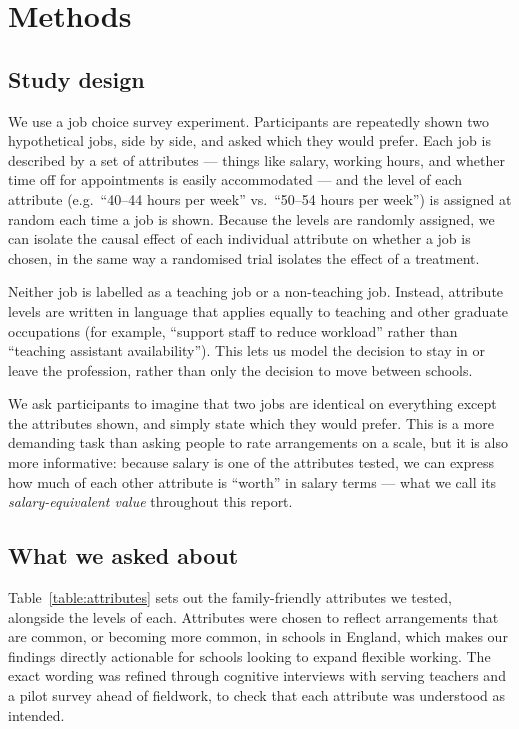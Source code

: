 \chapter{Methods}

\section{Study design}

We use a job choice survey experiment. Participants are repeatedly shown two hypothetical jobs,
side by side, and asked which they would prefer. Each job is described by a set of attributes ---
things like salary, working hours, and whether time off for appointments is easily accommodated
--- and the level of each attribute (e.g.\ ``40--44 hours per week'' vs.\ ``50--54 hours per
week'') is assigned at random each time a job is shown. Because the levels are randomly assigned,
we can isolate the causal effect of each individual attribute on whether a job is chosen, in the
same way a randomised trial isolates the effect of a treatment.

Neither job is labelled as a teaching job or a non-teaching job. Instead, attribute levels are
written in language that applies equally to teaching and other graduate occupations (for example,
``support staff to reduce workload'' rather than ``teaching assistant availability''). This lets
us model the decision to stay in or leave the profession, rather than only the decision to move
between schools.

We ask participants to imagine that two jobs are identical on everything except the attributes
shown, and simply state which they would prefer. This is a more demanding task than asking people
to rate arrangements on a scale, but it is also more informative: because salary is one of the
attributes tested, we can express how much of each other attribute is ``worth'' in salary terms
--- what we call its \emph{salary-equivalent value} throughout this report.

\section{What we asked about}

Table~\ref{table:attributes} sets out the family-friendly attributes we tested, alongside the
levels of each. Attributes were chosen to reflect arrangements that are common, or becoming more
common, in schools in England, which makes our findings directly actionable for schools looking
to expand flexible working. The exact wording was refined through cognitive interviews with
serving teachers and a pilot survey ahead of fieldwork, to check that each attribute was
understood as intended.


